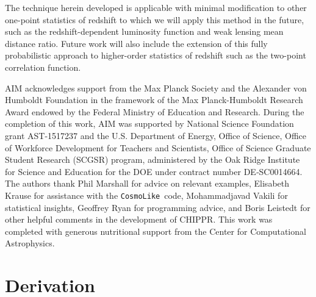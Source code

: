 \documentclass[iop]{emulateapj}
\newcommand{\todo}[3]{{\color{#2}\emph{#1}: #3}}
\newcommand{\aim}[1]{\todo{AIM}{red}{#1}}
\newcommand{\project}[1]{\textsc{#1}}
\newcommand{\Chippr}{\project{CHIPPR}}%
\newcommand{\repo}[1]{\texttt{#1}}
\newcommand{\cosmolike}{\repo{CosmoLike}}
\newcommand{\gvn}{\mid}%
\begin{document}
The technique herein developed is applicable with minimal modification to other one-point statistics of redshift to which we will apply this method in the future, such as the redshift-dependent luminosity function and weak lensing mean distance ratio.  
Future work will also include the extension of this fully probabilistic approach to higher-order statistics of redshift such as the two-point correlation function.

\begin{acknowledgements}
	AIM acknowledges support from the Max Planck Society and the Alexander von Humboldt Foundation in the framework of the Max Planck-Humboldt Research Award endowed by the Federal Ministry of Education and Research.
	During the completion of this work, AIM was supported by National Science Foundation grant AST-1517237 and the U.S. Department of Energy, Office of Science, Office of Workforce Development for Teachers and Scientists, Office of Science Graduate Student Research (SCGSR) program, administered by the Oak Ridge Institute for Science and Education for the DOE under contract number DE‐SC0014664.
	The authors thank Phil Marshall for advice on relevant examples, Elisabeth Krause for assistance with the \cosmolike\ code, Mohammadjavad Vakili for statistical insights, Geoffrey Ryan for programming advice, and Boris Leistedt for other helpful comments in the development of \Chippr.
	This work was completed with generous nutritional support from the Center for Computational Astrophysics.
\end{acknowledgements}


\appendix

\section{Derivation}
\label{app:math}

\end{document}
